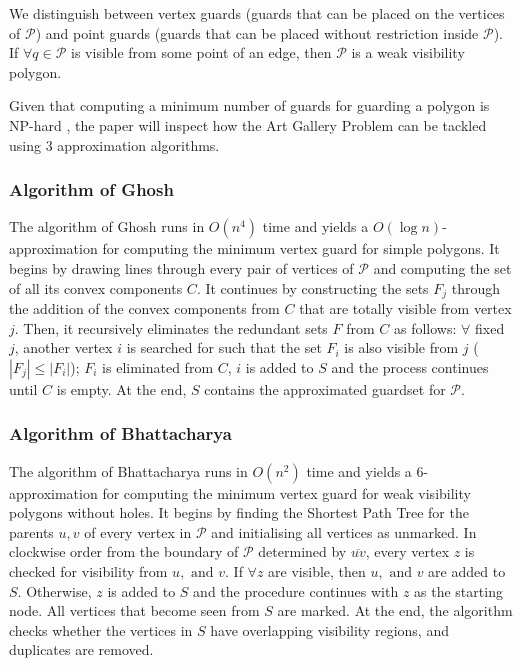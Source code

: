 We distinguish between vertex guards (guards that can be placed on the vertices of $\mathcal P$) and point guards (guards that can be placed without restriction inside $\mathcal P$). If $\forall q \in \mathcal P$ is visible from some point of an edge, then $\mathcal P$ is a weak visibility polygon.

Given that computing a minimum number of guards for guarding a polygon is NP-hard \cite{1057165}, the paper will inspect how the Art Gallery Problem \cite{o1987art} can be tackled using 3 approximation algorithms.

\subsubsection{Algorithm of Ghosh \cite{GHOSH2010718}}
The algorithm of Ghosh \cite{GHOSH2010718} runs in $O(n^4)$ time and yields a $O(\log n)$-approximation for computing the minimum vertex guard for simple polygons. It begins by drawing lines through every pair of vertices of $\mathcal P$ and computing the set of all its convex components $C$. It continues by constructing the sets $F_j$ through the addition of the convex components from $C$ that are totally visible from vertex $j$. Then, it recursively eliminates the redundant sets $F$ from $C$ as follows: $\forall$ fixed $j$, another vertex $i$ is searched for such that the set $F_i$ is also visible from $j$ ($|F_j| \leq |F_i|$); $F_i$ is eliminated from $C$, $i$ is added to $S$ and the process continues until $C$ is empty. At the end, $S$ contains the approximated guardset for $\mathcal P$.

\subsubsection{Algorithm of Bhattacharya \cite{bhattacharya2016approximability}}
The algorithm of Bhattacharya \cite{bhattacharya2016approximability} runs in $O(n^2)$ time and yields a 6-approximation for computing the minimum vertex guard for weak visibility polygons without holes. It begins by finding the Shortest Path Tree for the parents $u, v$ of every vertex in $\mathcal P$ and initialising all vertices as unmarked. In clockwise order from the boundary of $\mathcal P$ determined by $\overline{uv}$, every vertex $z$ is checked for visibility from $u, \text{ and } v$. If $\forall z$ are visible, then $u, \text{ and }v$ are added to $S$. Otherwise, $z$ is added to $S$ and the procedure continues with $z$ as the starting node. All vertices that become seen from $S$ are marked. At the end, the algorithm checks whether the vertices in $S$ have overlapping visibility regions, and duplicates are removed.

